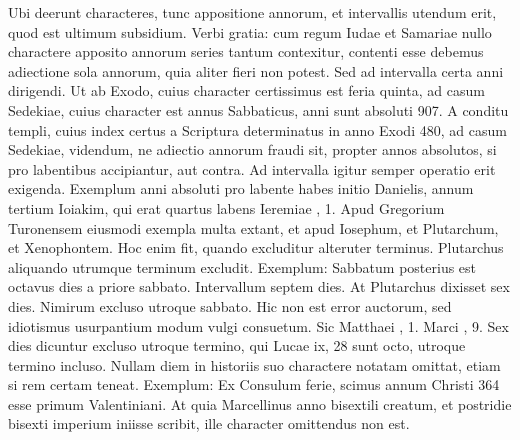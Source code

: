 Ubi deerunt characteres,
tunc appositione annorum, et intervallis utendum erit, quod est ultimum
subsidium.
Verbi gratia: cum regum Iudae et Samariae nullo
charactere apposito annorum series tantum contexitur, contenti esse
debemus adiectione sola annorum, quia aliter fieri non potest.
Sed
ad intervalla certa anni dirigendi.
Ut ab Exodo, cuius character certissimus
est feria quinta, ad casum Sedekiae, cuius character est annus
Sabbaticus, anni sunt absoluti 907.
A conditu templi, cuius index certus
a Scriptura determinatus in anno Exodi 480, ad casum Sedekiae,
videndum, ne adiectio annorum fraudi sit, propter annos absolutos,
si pro labentibus accipiantur, aut contra.
Ad intervalla igitur
semper operatio erit exigenda.
Exemplum anni absoluti pro labente
habes initio Danielis, annum tertium Ioiakim, qui erat quartus labens
Ieremiae , 1.
Apud Gregorium Turonensem eiusmodi
exempla multa extant, et apud Iosephum, et Plutarchum, et
Xenophontem.
Hoc enim fit, quando excluditur alteruter terminus.
Plutarchus aliquando utrumque terminum excludit.
Exemplum: Sabbatum
posterius est octavus dies a priore sabbato.
Intervallum septem
dies.
At Plutarchus dixisset sex dies.
Nimirum excluso utroque
sabbato.
Hic non est error auctorum, sed idiotismus usurpantium
modum vulgi consuetum.
Sic Matthaei , 1.
 Marci , 9.
Sex
dies dicuntur excluso utroque termino, qui Lucae {ix}, 28
 sunt octo,
utroque termino incluso.
Nullam diem in historiis suo charactere
notatam omittat, etiam si rem certam teneat.
Exemplum: Ex Consulum
ferie, scimus annum Christi 364 esse primum Valentiniani.
At quia Marcellinus anno bisextili creatum,
 et postridie bisexti imperium
iniisse scribit, ille character omittendus non est.
